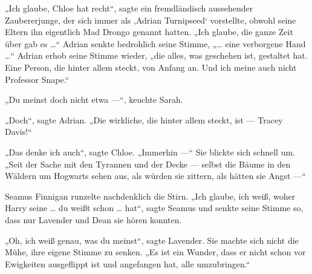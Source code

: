 „Ich glaube, Chloe hat recht“, sagte ein fremdländisch aussehender Zaubererjunge, der sich immer als ‚Adrian Turnipseed‘ vorstellte, obwohl seine Eltern ihn eigentlich Mad Drongo genannt hatten.
„Ich glaube, die ganze Zeit über gab es …“ Adrian senkte bedrohlich seine Stimme, „… eine verborgene Hand …“ Adrian erhob seine Stimme wieder, „die alles, was geschehen ist, gestaltet hat. Eine Person, die hinter allem steckt, von Anfang an. Und ich meine auch nicht Professor Snape.“

„Du meinst doch nicht etwa —“, keuchte Sarah.

„Doch“, sagte Adrian.
„Die wirkliche, die hinter allem steckt, ist — Tracey Davis!“

„Das denke ich auch“, sagte Chloe.
„Immerhin —“ Sie blickte sich schnell um.
„Seit der Sache mit den Tyrannen und der Decke — selbst die Bäume in den Wäldern um Hogwarts sehen aus, als würden sie zittern, als hätten sie Angst —“

Seamus Finnigan runzelte nachdenklich die Stirn.
„Ich glaube, ich weiß, woher Harry seine … du weißt schon … hat“, sagte Seamus und senkte seine Stimme so, dass nur Lavender und Dean sie hören konnten.

„Oh, ich weiß genau, was du meinst“, sagte Lavender. Sie machte sich nicht die Mühe, ihre eigene Stimme zu senken.
„Es ist ein Wunder, dass er nicht schon vor Ewigkeiten ausgeflippt ist und angefangen hat, alle umzubringen.“


